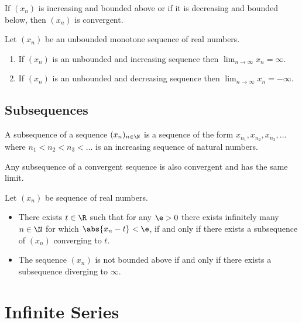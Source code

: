 \documentclass{article}
\begin{document}
\begin{theorem}
	If $(x_n)$ is increasing and bounded above or if it is decreasing and bounded below, then
	$(x_n)$ is convergent.
\end{theorem}

\setcounter{theorem}{3}
\begin{theorem}
	Let $(x_n)$ be an unbounded monotone sequence of real numbers.
	\begin{enumerate}
		\item If $(x_n)$ is an unbounded and increasing sequence then $\lim_{n\to\infty} x_n = \infty$.
		\item If $(x_n)$ is an unbounded and decreasing sequence then $\lim_{n\to\infty} x_n = -\infty$.
	\end{enumerate}
\end{theorem}

\subsection{Subsequences}

\begin{definition}
	A subsequence of a sequence $(x_n)_{n\in\N}$ is a sequence of the form $x_{n_1}, x_{n_2}, x_{n_3}, ...$
	where $n_1<n_2<n_3<...$ is an increasing sequence of natural numbers.
\end{definition}

\begin{lemma}
	Any subsequence of a convergent sequence is also convergent and has the same limit.
\end{lemma}

\begin{theorem}
	Let $(x_n)$ be sequence of real numbers.
	\begin{itemize}
		\item There exists $t\in\R$ such that for any $\e>0$ there exists infinitely many $n\in\N$
		      for which $\abs{x_n-t}<\e$, if and only if there exists a subsequence of $(x_n)$
		      converging to $t$.
		\item The sequence $(x_n)$ is not bounded above if and only if there exists a subsequence
		      diverging to $\infty$.
	\end{itemize}
\end{theorem}


\section{Infinite Series}
\end{document}
